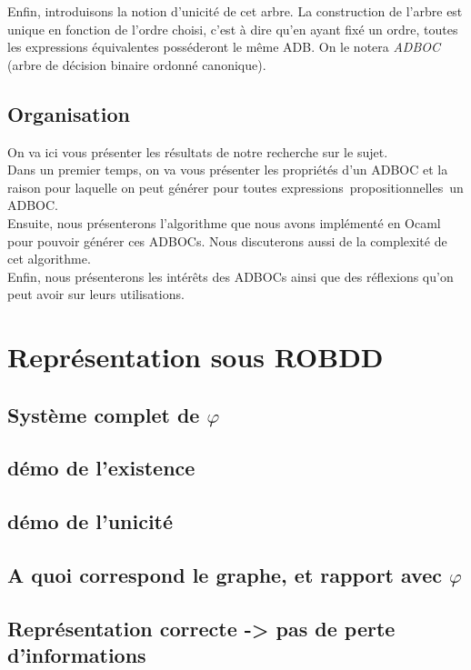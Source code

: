 \documentclass[a4paper, oneside]{report}
\newcommand{\expps}{expressions~propositionnelles~}
\begin{document}
Enfin, introduisons la notion d'unicité de cet arbre. La construction de l'arbre est unique en fonction de l'ordre choisi, c'est à dire qu'en ayant fixé un ordre, toutes les expressions équivalentes posséderont le même ADB. On le notera \textit{ADBOC} (arbre de décision binaire ordonné canonique).\\
 
\section*{Organisation}
On va ici vous présenter les résultats de notre recherche sur le sujet.\\
Dans un premier temps, on va vous présenter les propriétés d'un ADBOC et la raison pour laquelle on peut générer pour toutes \expps un ADBOC.\\
Ensuite, nous présenterons l'algorithme que nous avons implémenté en Ocaml pour pouvoir générer ces ADBOCs. Nous discuterons aussi de la complexité de cet algorithme.\\
Enfin, nous présenterons les intérêts des ADBOCs ainsi que des réflexions qu'on peut avoir sur leurs utilisations.  



\chapter{Représentation sous ROBDD}

\section{Système complet de $\varphi$}
\section{démo de l'existence}
\section{démo de l'unicité}
\section{A quoi correspond le graphe, et rapport avec $\varphi$}
\section{Représentation correcte -> pas de perte d'informations}
\end{document}
